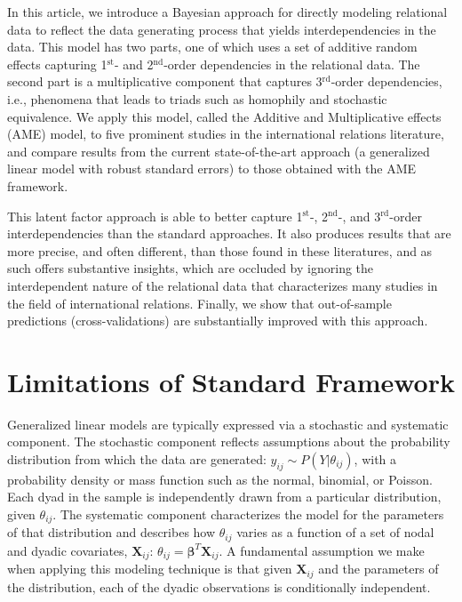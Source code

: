 \documentclass[12pt]{amsart}
\newcommand{\first}{1$^{\text{st}}$}
\newcommand{\second}{2$^{\text{nd}}$}
\newcommand{\third}{3$^{\text{rd}}$}
\begin{document}
In this article, we introduce a Bayesian approach for directly modeling relational data to reflect the data generating process that yields interdependencies in the data.  This model has two parts, one of which uses a set of additive random effects capturing \first- and \second-order dependencies in the relational data. The second part is a multiplicative component that captures \third-order dependencies, i.e., phenomena that leads to triads such as homophily and stochastic equivalence.  We apply this model, called the Additive and Multiplicative effects (AME) model, to five prominent studies in the international relations literature, and compare results from the current state-of-the-art approach (a generalized linear model with robust standard errors) to those obtained with the AME framework. 

This latent factor approach is able to better capture \first-, \second-, and \third-order interdependencies than the standard approaches. It also produces results that are more precise, and often different, than those found in these literatures, and as such offers substantive insights, which are occluded by ignoring the interdependent nature of the relational data that characterizes many studies in the field of international relations. Finally, we show that out-of-sample  predictions (cross-validations) are substantially improved with this approach.  

\section{\textbf{Limitations of Standard Framework}}

Generalized linear models are typically expressed via a stochastic and systematic component. The stochastic component reflects assumptions about the probability distribution from which the data are generated: $y_{ij} \sim P(Y | \theta_{ij})$, with a probability density or mass function such as the normal, binomial, or Poisson. Each dyad in the sample is independently drawn from a particular distribution, given $\theta_{ij}$. The systematic component characterizes the model for the parameters of that distribution and describes how $\theta_{ij}$ varies as a function of a set of nodal and dyadic covariates, $\mathbf{X}_{ij}$: $\theta_{ij} = \bm\beta^{T} \mathbf{X}_{ij}$. A fundamental assumption we make when applying this modeling technique is that given $\mathbf{X}_{ij}$ and the parameters of the distribution, each of the dyadic observations is conditionally independent.
\end{document}
